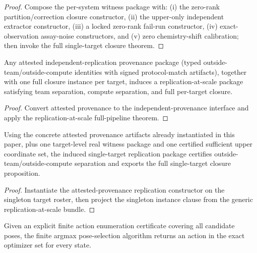 \begin{proof}
Compose the per-system witness package with: (i) the zero-rank partition/correction closure constructor, (ii) the upper-only independent extractor constructor, (iii) a locked zero-rank fail-run constructor, (iv) exact-observation assay-noise constructors, and (v) zero chemistry-shift calibration; then invoke the full single-target closure theorem.
\end{proof}

\begin{theorem}\label{thm:attested-provenance-replication-at-scale-constructor-bundle}
Any attested independent-replication provenance package (typed outside-team/outside-compute identities with signed protocol-match artifacts), together with one full closure instance per target, induces a replication-at-scale package satisfying team separation, compute separation, and full per-target closure.
\end{theorem}

\begin{proof}
Convert attested provenance to the independent-provenance interface and apply the replication-at-scale full-pipeline theorem.
\end{proof}

\begin{theorem}\label{thm:concrete-attested-single-target-replication-bundle}
Using the concrete attested provenance artifacts already instantiated in this paper, plus one target-level real witness package and one certified sufficient upper coordinate set, the induced single-target replication package certifies outside-team/outside-compute separation and exports the full single-target closure proposition.
\end{theorem}

\begin{proof}
Instantiate the attested-provenance replication constructor on the singleton target roster, then project the singleton instance clause from the generic replication-at-scale bundle.
\end{proof}

\begin{theorem}\label{thm:computable-finite-enumeration-pose-solver-optimal}
Given an explicit finite action enumeration certificate covering all candidate poses, the finite argmax pose-selection algorithm returns an action in the exact optimizer set for every state.
\end{theorem}

